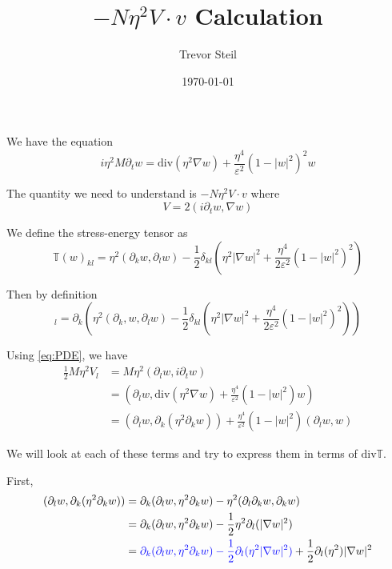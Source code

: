 \documentclass[a4paper]{article}
\title{$-N \eta^2 V \cdot v$ Calculation}
\date{\today}
\author{Trevor Steil}
\renewcommand{\div}{\mathrm{div}}
\newlength{\horizspace}
\newlength{\smallspace}
\begin{document}
\setlength{\horizspace}{1.5cm}
\setlength{\smallspace}{.7cm}
\maketitle


We have the equation
\begin{equation}
  i \eta^2 M \partial_t w = \div (\eta^2 \nabla w) + \frac{\eta^4}{\varepsilon^2} (1-|w|^2)^2 w
  \label{eq:PDE}
\end{equation}

The quantity we need to understand is $-N \eta^2 V \cdot v$ where
\begin{equation}
  V = 2 ( i \partial_t w, \nabla w )
  \label{def:V}
\end{equation}

We define the stress-energy tensor as
\begin{equation}
  \mathbb{T}(w)_{kl} = \eta^2 (\partial_k w, \partial_l w) - \frac{1}{2} \delta_{kl} \left( \eta^2 | \nabla w |^2 + \frac{\eta^4}{2 \varepsilon^2}
  (1-|w|^2)^2 \right)
  \label{def:T}
\end{equation}

Then by definition
\begin{equation}
  [ \div \mathbb{T}(w) ]_l = \partial_k \left( \eta^2 (\partial_k, w, \partial_l w) - \frac{1}{2} \delta_{kl} \left( \eta^2 |\nabla w|^2 +
  \frac{\eta^4}{2 \varepsilon^2} ( 1- |w|^2 )^2 \right) \right)
  \label{eq:div_T}
\end{equation}

Using \eqref{eq:PDE}, we have
\begin{align}
  \frac{1}{2} M \eta^2 V_l &= M \eta^2 ( \partial_l w, i \partial_t w ) \nonumber \\
  &= \left( \partial_l w, \div ( \eta^2 \nabla w ) + \frac{\eta^4}{\varepsilon^2}( 1 - |w|^2 )w \right) \nonumber \\
  &= ( \partial_l w, \partial_k ( \eta^2 \partial_k w ) ) + \frac{\eta^4}{\varepsilon^2} ( 1 - |w|^2 ) ( \partial_l w, w )
  \label{eq:V_l}
\end{align}

We will look at each of these terms and try to express them in terms of $\div \mathbb{T}$.

First,
\begin{align}
  ( \partial_l w, \partial_k ( \eta^2 \partial_k w ) ) &= \partial_k ( \partial_l w, \eta^2 \partial_k w) - \eta^2 ( \partial_l \partial_k w,
  \partial_k w ) \nonumber \\
  &= \partial_k ( \partial_l w, \eta^2 \partial_k w) - \frac{1}{2} \eta^2 \partial_l ( | \nabla w |^2 ) \nonumber \\
  &= { \color{blue} \partial_k ( \partial_l w, \eta^2 \partial_k w) - \frac{1}{2} \partial_l ( \eta^2 |\nabla w|^2 ) } + \frac{1}{2} \partial_l
  (\eta^2) | \nabla w |^2
  \label{eq:V_l_term1}
\end{align}
\end{document}
